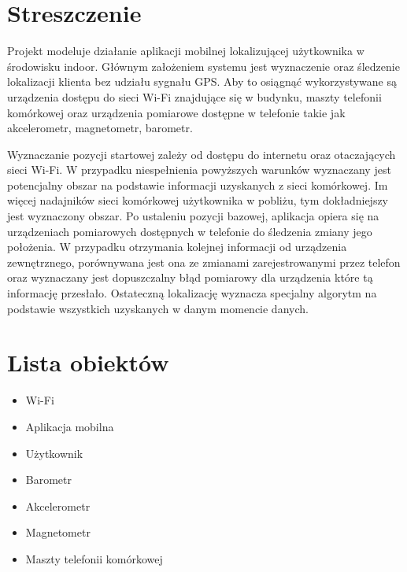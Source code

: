 \documentclass[11pt]{article}
\begin{document}
	\tableofcontents
	\cleardoublepage
	\setcounter{page}{2}
	
	
	\section{Streszczenie}
	Projekt modeluje działanie aplikacji mobilnej lokalizującej użytkownika w środowisku indoor. 
	Głównym założeniem systemu jest wyznaczenie oraz śledzenie lokalizacji klienta bez udziału sygnału GPS. Aby to osiągnąć wykorzystywane są urządzenia dostępu do sieci Wi-Fi znajdujące się w budynku, maszty telefonii komórkowej oraz urządzenia pomiarowe dostępne w telefonie takie jak akcelerometr, magnetometr, barometr.
	
	Wyznaczanie pozycji startowej zależy od dostępu do internetu oraz otaczających sieci Wi-Fi.
	W przypadku niespełnienia powyższych warunków wyznaczany jest potencjalny obszar na podstawie informacji uzyskanych z sieci komórkowej. Im więcej nadajników sieci komórkowej użytkownika w pobliżu, tym dokładniejszy jest wyznaczony obszar.
	Po ustaleniu pozycji bazowej, aplikacja opiera się na urządzeniach pomiarowych dostępnych  w telefonie do śledzenia zmiany jego położenia. W przypadku otrzymania kolejnej informacji od urządzenia zewnętrznego, porównywana jest ona ze zmianami zarejestrowanymi przez telefon oraz wyznaczany jest dopuszczalny błąd pomiarowy dla urządzenia które tą informację przesłało. Ostateczną lokalizację wyznacza specjalny algorytm na podstawie wszystkich uzyskanych w danym momencie danych.
	
	\section{Lista obiektów}
	\begin{itemize}
		\item Wi-Fi
		\item Aplikacja mobilna
		\item Użytkownik
		\item Barometr
		\item Akcelerometr
		\item Magnetometr
		\item Maszty telefonii komórkowej
	\end{itemize}
	
\end{document}
